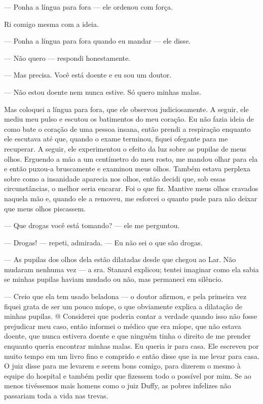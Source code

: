 --- Ponha a língua para fora --- ele ordenou com força.

Ri comigo mesma com a ideia.

--- Ponha a língua para fora quando eu mandar --- ele disse.

--- Não quero --- respondi honestamente.

--- Mas precisa. Você está doente e eu sou um doutor.

--- Não estou doente nem nunca estive. Só quero minhas malas.

Mas
coloquei a língua para fora, que ele observou judiciosamente. A seguir,
ele mediu meu pulso e escutou os batimentos do meu coração. Eu não fazia
ideia de como bate o coração de uma pessoa insana, então prendi a
respiração enquanto ele escutava até que, quando o exame terminou,
fiquei ofegante para me recuperar. A seguir, ele experimentou o efeito
da luz sobre as pupilas de meus olhos. Erguendo a mão a um centímetro do
meu rosto, me mandou olhar para ela e então puxou-a bruscamente e
examinou meus olhos. Também estava perplexa sobre como a insanidade
aparecia nos olhos, então decidi que, sob essas circunstâncias, o melhor
seria encarar. Foi o que fiz. Mantive meus olhos cravados naquela mão e,
quando ele a removeu, me esforcei o quanto pude para não deixar que meus
olhos piscassem.

--- Que drogas você está tomando? --- ele me perguntou.

--- Drogas! --- repeti, admirada. --- Eu não sei o que são drogas.

--- As pupilas dos olhos dela estão dilatadas desde que chegou ao Lar.
Não mudaram nenhuma vez --- a sra. Stanard explicou; tentei imaginar
como ela sabia se minhas pupilas haviam mudado ou não, mas permaneci em
silêncio.

--- Creio que ela tem usado beladona --- o doutor afirmou, e pela
primeira vez fiquei grata de ser um pouco míope, o que obviamente
explica a dilatação de minhas pupilas. @ Considerei que poderia contar a
verdade quando isso não fosse prejudicar meu caso, então informei o
médico que era míope, que não estava doente, que nunca estivera doente e
que ninguém tinha o direito de me prender enquanto queria encontrar
minhas malas. Eu queria ir para casa. Ele escreveu por muito tempo em um
livro fino e comprido e então disse que ia me levar para casa. O juiz
disse para me levarem e serem bons comigo, para dizerem o mesmo à equipe
do hospital e também pedir que fizessem todo o possível por mim. Se ao
menos tivéssemos mais homens como o juiz Duffy, as pobres infelizes não
passariam toda a vida nas trevas.

